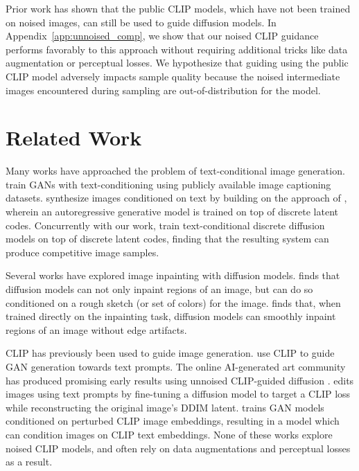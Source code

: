 Prior work \citet{clipdiff,secondarymodelmethod} has shown that the public CLIP models, which have not been trained on noised images, can still be used to guide diffusion models. In Appendix~\ref{app:unnoised_comp}, we show that our noised CLIP guidance performs favorably to this approach without requiring additional tricks like data augmentation or perceptual losses. We hypothesize that guiding using the public CLIP model adversely impacts sample quality because the noised intermediate images encountered during sampling are out-of-distribution for the model.

\section{Related Work}
\label{sec:related_work}

Many works have approached the problem of text-conditional image generation. \citet{attngan,dmgan,dfgan,xmcgan,textcl} train GANs with text-conditioning using publicly available image captioning datasets. \citet{dalle} synthesize images conditioned on text by building on the approach of \citet{vqvae}, wherein an autoregressive generative model is trained on top of discrete latent codes. Concurrently with our work, \citet{vqdiff} train text-conditional discrete diffusion models on top of discrete latent codes, finding that the resulting system can produce competitive image samples.

Several works have explored image inpainting with diffusion models. \citet{sdedit} finds that diffusion models can not only inpaint regions of an image, but can do so conditioned on a rough sketch (or set of colors) for the image. \citet{palette} finds that, when trained directly on the inpainting task, diffusion models can smoothly inpaint regions of an image without edge artifacts.

CLIP has previously been used to guide image generation. \citet{clipglass,styleclip,bigsleep,stylegannada} use CLIP to guide GAN generation towards text prompts. The online AI-generated art community has produced promising early results using unnoised CLIP-guided diffusion \citep{clipdiff,secondarymodelmethod}. \citet{diffusionclip} edits images using text prompts by fine-tuning a diffusion model to target a CLIP loss while reconstructing the original image's DDIM \citep{ddim} latent. \mbox{\citet{lafite}} trains GAN models conditioned on perturbed CLIP image embeddings, resulting in a model which can condition images on CLIP text embeddings. None of these works explore noised CLIP models, and often rely on data augmentations and perceptual losses as a result.

